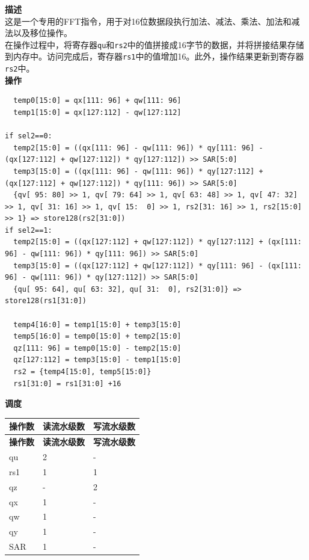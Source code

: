 \textbf{描述}\\
这是一个专用的FFT指令，用于对16位数据段执行加法、减法、乘法、加法和减法以及移位操作。\\
在操作过程中，将寄存器\lstinline{qu}和\lstinline{rs2}中的值拼接成16字节的数据，并将拼接结果存储到内存中。访问完成后，寄存器\lstinline{rs1}中的值增加16。此外，操作结果更新到寄存器\lstinline{rs2}中。\\
\textbf{操作}
\begin{lstlisting}
  temp0[15:0] = qx[111: 96] + qw[111: 96]
  temp1[15:0] = qx[127:112] - qw[127:112]

if sel2==0:
  temp2[15:0] = ((qx[111: 96] - qw[111: 96]) * qy[111: 96] - (qx[127:112] + qw[127:112]) * qy[127:112]) >> SAR[5:0]
  temp3[15:0] = ((qx[111: 96] - qw[111: 96]) * qy[127:112] + (qx[127:112] + qw[127:112]) * qy[111: 96]) >> SAR[5:0]
  {qv[ 95: 80] >> 1, qv[ 79: 64] >> 1, qv[ 63: 48] >> 1, qv[ 47: 32] >> 1, qv[ 31: 16] >> 1, qv[ 15:  0] >> 1, rs2[31: 16] >> 1, rs2[15:0] >> 1} => store128(rs2[31:0])
if sel2==1:
  temp2[15:0] = ((qx[127:112] + qw[127:112]) * qy[127:112] + (qx[111: 96] - qw[111: 96]) * qy[111: 96]) >> SAR[5:0]
  temp3[15:0] = ((qx[127:112] + qw[127:112]) * qy[111: 96] - (qx[111: 96] - qw[111: 96]) * qy[127:112]) >> SAR[5:0]
  {qu[ 95: 64], qu[ 63: 32], qu[ 31:  0], rs2[31:0]} => store128(rs1[31:0])

  temp4[16:0] = temp1[15:0] + temp3[15:0]
  temp5[16:0] = temp0[15:0] + temp2[15:0]
  qz[111: 96] = temp0[15:0] - temp2[15:0]
  qz[127:112] = temp3[15:0] - temp1[15:0]
  rs2 = {temp4[15:0], temp5[15:0]}
  rs1[31:0] = rs1[31:0] +16
\end{lstlisting}

\textbf{调度}\\
\begin{longtable}[c]{|l|l|l|}
    \hline
    \rowcolor{lightgray}
    \textbf{操作数} & \textbf{读流水级数} & \textbf{写流水级数} \\\hline
    \endfirsthead
    \hline
    \rowcolor{lightgray}
     \textbf{操作数} & \textbf{读流水级数} & \textbf{写流水级数} \\\hline
    \endhead
    \hline
    \endfoot

  qu & 2 & - \\\hline
  rs1 & 1 & 1 \\\hline
  qz & - & 2 \\\hline
  qx & 1 & - \\\hline
  qw & 1 & - \\\hline
  qy & 1 & - \\\hline
  SAR & 1 & -

\end{longtable}

